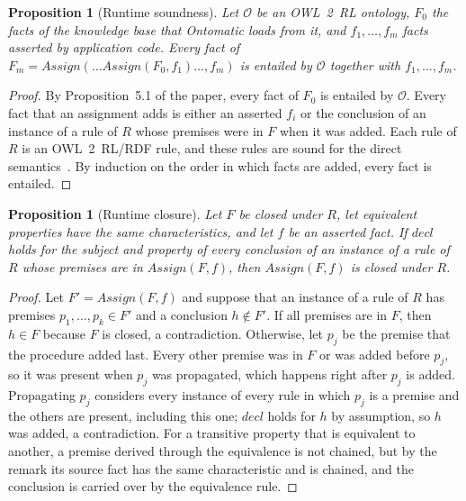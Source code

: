 \documentclass[11pt, a4paper]{article}
\theoremstyle{plain}
\newtheorem{proposition}[theorem]{Proposition}
\theoremstyle{definition}
\theoremstyle{remark}
\begin{document}
\begin{proposition}[Runtime soundness]
\label{prop:runtime-soundness}
Let $\mathcal{O}$ be an OWL~2~RL ontology, $F_0$ the facts of the knowledge base that Ontomatic
loads from it, and $f_1,\dots,f_m$ facts asserted by application code. Every fact of
$F_m=\mathit{Assign}(\dots\mathit{Assign}(F_0,f_1)\dots,f_m)$ is entailed by $\mathcal{O}$ together
with $f_1,\dots,f_m$.
\end{proposition}

\begin{proof}
By Proposition~5.1 of the paper, every fact of $F_0$ is entailed by $\mathcal{O}$. Every fact that
an assignment adds is either an asserted $f_i$ or the conclusion of an instance of a rule of
$R$ whose premises were in $F$ when it was added. Each rule of $R$ is an OWL~2~RL/RDF rule, and
these rules are sound for the direct semantics~\cite{motik2012owl2profiles}. By induction on the
order in which facts are added, every fact is entailed.
\end{proof}

\begin{proposition}[Runtime closure]
\label{prop:runtime-closure}
Let $F$ be closed under $R$, let equivalent properties have the same characteristics, and let
$f$ be an asserted fact. If $\mathit{decl}$ holds for the subject and property of every
conclusion of an instance of a rule of $R$ whose premises are in $\mathit{Assign}(F,f)$, then
$\mathit{Assign}(F,f)$ is closed under $R$.
\end{proposition}

\begin{proof}
Let $F'=\mathit{Assign}(F,f)$ and suppose that an instance of a rule of $R$ has premises
$p_1,\dots,p_k\in F'$ and a conclusion $h\notin F'$. If all premises are in $F$, then $h\in F$
because $F$ is closed, a contradiction. Otherwise, let $p_j$ be the premise that the procedure
added last. Every other premise was in $F$ or was added before $p_j$, so it was present when
$p_j$ was propagated, which happens right after $p_j$ is added. Propagating $p_j$ considers
every instance of every rule in which $p_j$ is a premise and the others are present, including
this one; $\mathit{decl}$ holds for $h$ by assumption, so $h$ was added, a contradiction.
For a transitive property that is equivalent to another, a premise derived through the
equivalence is not chained, but by the remark its source fact has the same characteristic and
is chained, and the conclusion is carried over by the equivalence rule.
\end{proof}
\end{document}
